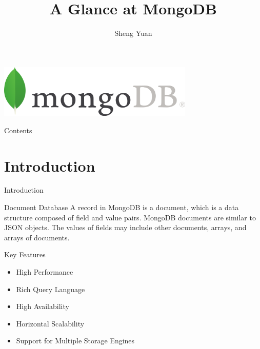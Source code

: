 \documentclass{beamer}
\title{A Glance at MongoDB}
\author{Sheng Yuan}
\begin{document}
    
\begin{frame}
	\centering\includegraphics[width=0.7\textwidth]{mongodb-logo.png}
    \titlepage
\end{frame}

\begin{frame}{Contents}
    \tableofcontents
\end{frame}

\section{Introduction}
\begin{frame}{Introduction}
	\begin{block}{Document Database}
		A record in MongoDB is a document, which is a data structure composed of field and value pairs. MongoDB documents are similar to JSON objects. The values of fields may include other documents, arrays, and arrays of documents.
	\end{block}
	\begin{block}{Key Features}
		\begin{itemize}
			\item High Performance
			\item Rich Query Language
			\item High Availability
			\item Horizontal Scalability
			\item Support for Multiple Storage Engines
		\end{itemize}
		
	\end{block}
    
\end{frame}
\end{document}
